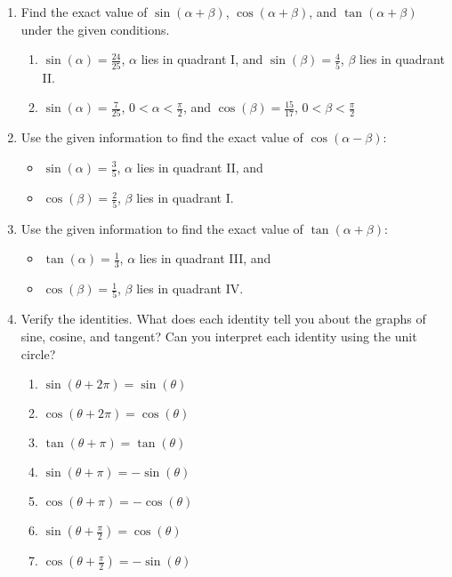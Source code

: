 \begin{enumerate}
\begin{enumerate}
\end{enumerate}

\newpage

\item Find the exact value of $\sin(\alpha+\beta)$, $\cos(\alpha+\beta)$, and $\tan(\alpha+\beta)$ under the given conditions.

\begin{enumerate}
\item $\sin(\alpha)=\frac{24}{25}$, $\alpha$ lies in quadrant I, and $\sin(\beta)=\frac{4}{5}$, $\beta$ lies in quadrant II.
\vfill


\item $\sin(\alpha)=\frac{7}{25}$, $0<\alpha<\frac{\pi}{2}$, and $\cos(\beta)=\frac{15}{17}$, $0<\beta<\frac{\pi}{2}$
\vfill
\end{enumerate}

\newpage

\item Use the given information to find the exact value of $\cos(\alpha-\beta)$:
\begin{itemize}
	\item $\sin(\alpha)=\frac{3}{5}$, $\alpha$ lies in quadrant II, and
	\item  $\cos(\beta)=\frac{2}{5}$, $\beta$ lies in quadrant I.
\end{itemize}
\vfill

\item Use the given information to find the exact value of $\tan(\alpha+\beta)$:
\begin{itemize}
	\item $\tan(\alpha)=\frac{1}{3}$, $\alpha$ lies in quadrant III, and
	\item $\cos(\beta)=\frac{1}{5}$, $\beta$ lies in quadrant IV.

\end{itemize}

\vfill
\newpage

\item Verify the identities.  What does each identity tell you about the graphs of sine, cosine, and tangent?  Can you interpret each identity using the unit circle?

\begin{enumerate}
\item $\displaystyle\sin\left(\theta+2\pi\right)=\sin(\theta)$
\vfill
\item $\displaystyle\cos\left(\theta+2\pi\right)=\cos(\theta)$
\vfill
\item $\displaystyle\tan\left(\theta+\pi\right)=\tan(\theta)$
\vfill
\item $\displaystyle\sin\left(\theta+\pi\right)=-\sin(\theta)$
\vfill
\item $\displaystyle\cos\left(\theta+\pi\right)=-\cos(\theta)$
\vfill
\item $\displaystyle\sin\left(\theta+\frac{\pi}{2}\right)=\cos(\theta)$
\vfill
\item $\displaystyle\cos\left(\theta+\frac{\pi}{2}\right)=-\sin(\theta)$
\vfill


\end{enumerate}
\end{enumerate}
